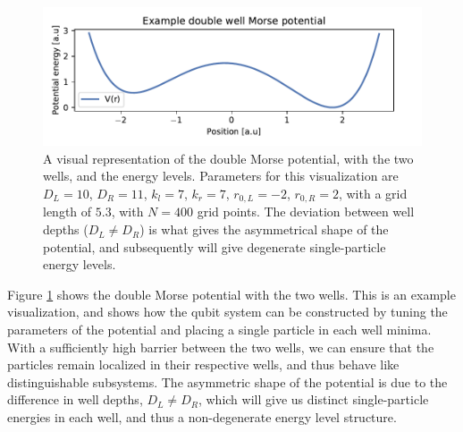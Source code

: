 \documentclass{subfiles}
\begin{document}
\begin{figure}[h!]
    \centering
    \includegraphics[width=1.0\textwidth]{figs/double_well_potential.pdf}
    \caption{A visual representation of the double Morse potential, with the two wells, and the energy levels. Parameters for this visualization are $D_L=10$, $D_R=11$, $k_l=7$, $k_r=7$, $r_{0,L}=-2$, $r_{0,R}=2$, with a grid length of $5.3$, with $N=400$ grid points. The deviation between well depths ($D_L \neq D_R$) is what gives the asymmetrical shape of the potential, and subsequently will give degenerate single-particle energy levels.} 
    \label{fig:double_well_morse_potential}
\end{figure}
Figure \ref{fig:double_well_morse_potential} shows the double Morse potential with the two wells. This is an example visualization, and shows how the qubit system can be constructed by tuning the parameters of the potential and placing a single particle in each well minima. With a sufficiently high barrier between the two wells, we can ensure that the particles remain localized in their respective wells, and thus behave like distinguishable subsystems. The asymmetric shape of the potential is due to the difference in well depths, $D_L \neq D_R$, which will give us distinct single-particle energies in each well, and thus a non-degenerate energy level structure.  
\end{document}
